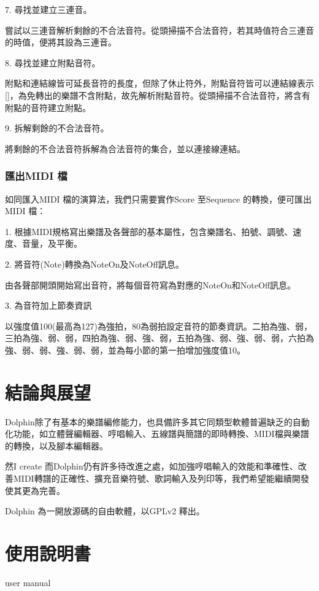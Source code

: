 \documentclass[12pt,a4paper,oneside]{report}
\begin{document}
7. 尋找並建立三連音。 

嘗試以三連音解析剩餘的不合法音符。從頭掃描不合法音符，若其時值符合三連音的時值，便將其設為三連音。

8. 尋找並建立附點音符。

附點和連結線皆可延長音符的長度，但除了休止符外，附點音符皆可以連結線表示[]，為免轉出的樂譜不含附點，故先解析附點音符。從頭掃描不合法音符，將含有附點的音符建立附點。

9. 拆解剩餘的不合法音符。

將剩餘的不合法音符拆解為合法音符的集合，並以連接線連結。

\subsection{匯出MIDI 檔} %

如同匯入MIDI 檔的演算法，我們只需要實作Score 至Sequence 的轉換，便可匯出MIDI 檔：

1. 根據MIDI規格寫出樂譜及各聲部的基本屬性，包含樂譜名、拍號、調號、速度、音量，及平衡。 

2. 將音符(Note)轉換為NoteOn及NoteOff訊息。 

由各聲部開頭開始寫出音符，將每個音符寫為對應的NoteOn和NoteOff訊息。

3. 為音符加上節奏資訊

以強度值100(最高為127)為強拍，80為弱拍設定音符的節奏資訊。二拍為強、弱，三拍為強、弱、弱，四拍為強、弱、強、弱，五拍為強、弱、強、弱、弱，六拍為強、弱、弱、強、弱、弱，並為每小節的第一拍增加強度值10。



\chapter{結論與展望}

Dolphin除了有基本的樂譜編修能力，也具備許多其它同類型軟體普遍缺乏的自動化功能，如立體聲編輯器、哼唱輸入、五線譜與簡譜的即時轉換、MIDI檔與樂譜的轉換，以及腳本編輯器。

然I create 而Dolphin仍有許多待改進之處，如加強哼唱輸入的效能和準確性、改善MIDI轉譜的正確性、擴充音樂符號、歌詞輸入及列印等，我們希望能繼續開發使其更為完善。

Dolphin 為一開放源碼的自由軟體，以GPLv2 釋出。


\appendix

\chapter{使用說明書} user manual
\end{document}
